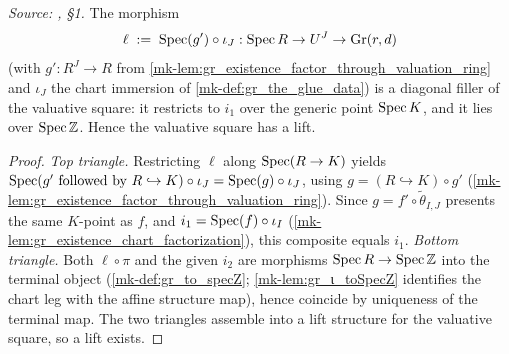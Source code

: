\begin{lemma}\label{mk-lem:gr_existence_lift}
  \leanok

  \textit{Source: \cite{nitsure-hilbert-quot}, \S 1.}
  The morphism
  \[
    \ell \;:=\; \operatorname{Spec}(g') \circ \iota_J : \operatorname{Spec} R \to U^J \to \mathrm{Gr}(r,d)
  \]
  (with \(g' : R^J \to R\) from
  \ref{mk-lem:gr_existence_factor_through_valuation_ring} and \(\iota_J\) the chart
  immersion of \ref{mk-def:gr_the_glue_data}) is a diagonal filler of the valuative
  square: it restricts to \(i_1\) over the generic point \(\operatorname{Spec} K\), and it lies
  over \(\operatorname{Spec} \mathbb{Z}\). Hence the valuative square has a lift.
\end{lemma}
\begin{proof}
  \leanok
    \emph{Top triangle.} Restricting \(\ell\) along \(\operatorname{Spec}(R \to K)\) yields
  \(\operatorname{Spec}(g' \text{ followed by } R \hookrightarrow K) \circ \iota_J = \operatorname{Spec}(g)
  \circ \iota_J\), using \(g = (R \hookrightarrow K)\circ g'\)
  (\ref{mk-lem:gr_existence_factor_through_valuation_ring}). Since \(g = f' \circ
  \tilde\theta_{I,J}\) presents the same \(K\)-point as \(f\), and \(i_1 = \operatorname{Spec}(f)
  \circ \iota_I\) (\ref{mk-lem:gr_existence_chart_factorization}), this composite
  equals \(i_1\). \emph{Bottom triangle.} Both \(\ell \circ \pi\) and the given
  \(i_2\) are morphisms \(\operatorname{Spec} R \to \operatorname{Spec} \mathbb{Z}\) into the terminal object
  (\ref{mk-def:gr_to_specZ}; \ref{mk-lem:gr_ι_toSpecZ} identifies the chart leg with the
  affine structure map), hence coincide by uniqueness of the terminal map. The two
  triangles assemble into a lift structure for the valuative square, so a lift
  exists.
\end{proof}

